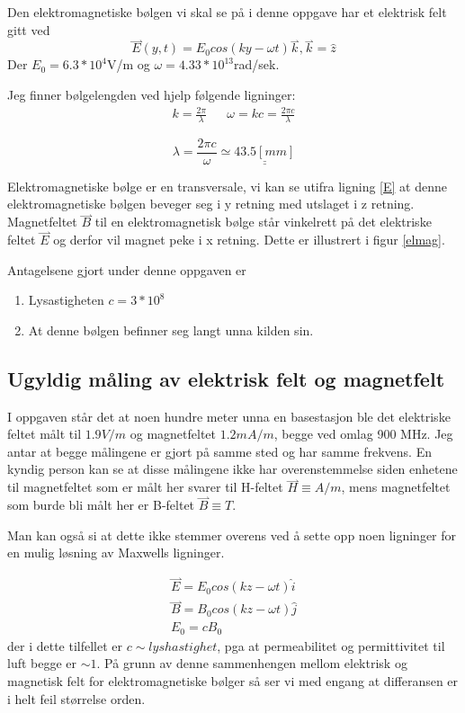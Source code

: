 \documentclass[a4paper,12pt,norsk]{article}
\newcommand{\uu}{\underline}
\newcommand{\ov}{\overset}
\begin{document}
Den elektromagnetiske bølgen vi skal se på i denne oppgave har et elektrisk felt gitt ved
\begin{equation}
\ov{\rightharpoonup}{E}(y,t) = E_0cos(ky-\omega t)\ov{\rightharpoonup}{k} , \ov{\rightharpoonup}{k} = \hat{z}
\label{E}
\end{equation}
Der $E_0 = 6.3*10^4$V/m og $\omega = 4.33*10^{13}$rad/sek.

Jeg finner bølgelengden ved hjelp følgende ligninger:
\begin{align*}
k = \frac{2\pi}{\lambda} && \omega = kc = \frac{2\pi c}{\lambda}
\end{align*}

$$
\lambda = \frac{2\pi c}{\omega} \simeq \uu{\uu{43.5[mm]}}
$$

Elektromagnetiske bølge er en transversale, vi kan se utifra ligning \ref{E} at denne elektromagnetiske bølgen beveger seg i y retning med utslaget i z retning.
Magnetfeltet $\ov{\rightharpoonup}{B}$ til en elektromagnetisk bølge står vinkelrett på det elektriske feltet $\ov{\rightharpoonup}{E}$ og derfor vil magnet peke i x retning. Dette er illustrert i figur \vref{elmag}.

Antagelsene gjort under denne oppgaven er
\begin{enumerate}
\item
Lysastigheten $c = 3*10^8$
\item
At denne bølgen befinner seg langt unna kilden sin.
\end{enumerate}

\subsection{Ugyldig måling av elektrisk felt og magnetfelt }
I oppgaven står det at noen hundre meter unna en basestasjon ble det elektriske feltet målt til $1.9V/m$ og magnetfeltet $1.2mA/m$, begge ved omlag 900 MHz. Jeg antar at begge målingene er gjort på samme sted og har samme frekvens. 
En kyndig person kan se at disse målingene ikke har overenstemmelse siden enhetene til magnetfeltet som er målt her svarer til H-feltet $\ov{\rightharpoonup}{H} \equiv A/m$, mens magnetfeltet som burde bli målt her er B-feltet $\ov{\rightharpoonup}{B} \equiv T$.

Man kan også si at dette ikke stemmer overens ved å sette opp noen ligninger for en mulig løsning av Maxwells ligninger. 

\begin{align*}
\ov{\rightharpoonup}{E} = E_0cos(kz-\omega t)\hat{i} \\
\ov{\rightharpoonup}{B }= B_0cos(kz-\omega t)\hat{j}\\
E_0 = cB_0
\end{align*}
der i dette tilfellet er $c\sim lyshastighet$, pga at permeabilitet og permittivitet til luft begge er $\sim 1$.
På grunn av denne sammenhengen mellom elektrisk og magnetisk felt for elektromagnetiske bølger så ser vi med engang at differansen er i helt feil størrelse orden. 
\end{document}

